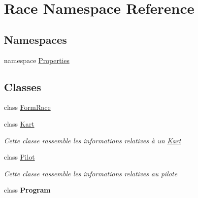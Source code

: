 \hypertarget{namespace_race}{}\section{Race Namespace Reference}
\label{namespace_race}
\subsection*{Namespaces}
\begin{DoxyCompactItemize}
\item 
namespace \hyperlink{namespace_race_1_1_properties}{Properties}
\end{DoxyCompactItemize}
\subsection*{Classes}
\begin{DoxyCompactItemize}
\item 
class \hyperlink{class_race_1_1_form_race}{Form\+Race}
\item 
class \hyperlink{class_race_1_1_kart}{Kart}
\begin{DoxyCompactList}\small\item\em Cette classe rassemble les informations relatives à un \hyperlink{class_race_1_1_kart}{Kart} \end{DoxyCompactList}\item 
class \hyperlink{class_race_1_1_pilot}{Pilot}
\begin{DoxyCompactList}\small\item\em Cette classe rassemble les informations relatives au pilote \end{DoxyCompactList}\item 
class {\bfseries Program}
\end{DoxyCompactItemize}
